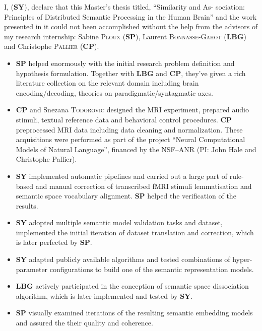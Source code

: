 \begin{declarationcontribution}
    \addchaptertocentry{\contributionname} %
    \noindent I, \authorname (\textbf{SY}), declare that this Master's thesis titled, \enquote{Similarity and As- sociation: Principles of Distributed Semantic Processing in the Human Brain} and the work presented in it could not been accomplished without the help from the advisors of my research internship: Sabine \textsc{Ploux} (\textbf{SP}), Laurent \textsc{Bonnasse-Gahot} (\textbf{LBG}) and Christophe \textsc{Pallier} (\textbf{CP}).
    
    \begin{itemize} 
    \item \textbf{SP} helped enormously with the initial research problem definition and hypothesis formulation. Together with \textbf{LBG} and \textbf{CP}, they've given a rich literature collection on the relevant domain including brain encoding/decoding, theories on paradigmatic/syntagmatic axes.
    \item \textbf{CP} and Snezana \textsc{Todorovic} designed the MRI experiment, prepared audio stimuli, textual reference data and behavioral control procedures. \textbf{CP} preprocessed MRI data including data cleaning and normalization. These acquisitions were performed as part of the project ``Neural Computational Models of Natural Language'', financed by the NSF--ANR (PI: John Hale and Christophe Pallier).
    \item \textbf{SY} implemented automatic pipelines and carried out a large part of rule-based and manual correction of transcribed fMRI stimuli lemmatisation and semantic space vocabulary alignment. \textbf{SP} helped the verification of the results.
    \item \textbf{SY} adopted multiple semantic model validation tasks and dataset, implemented the initial iteration of dataset translation and correction, which is later perfected by \textbf{SP}.
    \item \textbf{SY} adapted publicly available algorithms and tested combinations of hyper-parameter configurations to build one of the semantic representation models.
    \item \textbf{LBG} actively participated in the conception of semantic space dissociation algorithm, which is later implemented and tested by \textbf{SY}. 
    \item \textbf{SP} visually examined iterations of the resulting semantic embedding models and assured the their quality and coherence.

\end{itemize}
\end{declarationcontribution}
